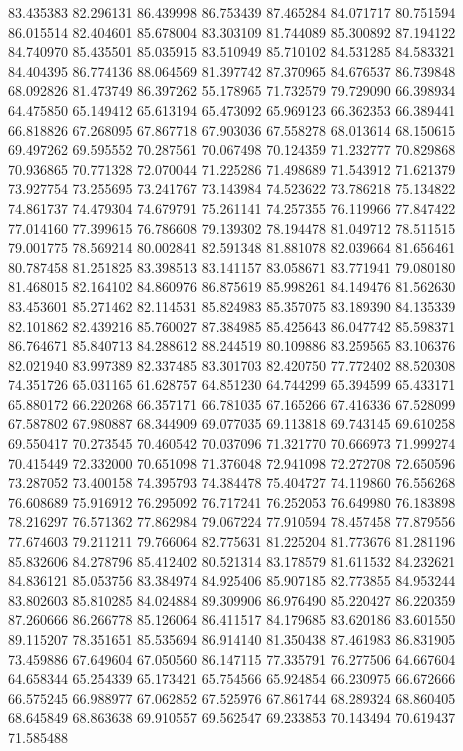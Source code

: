 83.435383
82.296131
86.439998
86.753439
87.465284
84.071717
80.751594
86.015514
82.404601
85.678004
83.303109
81.744089
85.300892
87.194122
84.740970
85.435501
85.035915
83.510949
85.710102
84.531285
84.583321
84.404395
86.774136
88.064569
81.397742
87.370965
84.676537
86.739848
68.092826
81.473749
86.397262
55.178965
71.732579
79.729090
66.398934
64.475850
65.149412
65.613194
65.473092
65.969123
66.362353
66.389441
66.818826
67.268095
67.867718
67.903036
67.558278
68.013614
68.150615
69.497262
69.595552
70.287561
70.067498
70.124359
71.232777
70.829868
70.936865
70.771328
72.070044
71.225286
71.498689
71.543912
71.621379
73.927754
73.255695
73.241767
73.143984
74.523622
73.786218
75.134822
74.861737
74.479304
74.679791
75.261141
74.257355
76.119966
77.847422
77.014160
77.399615
76.786608
79.139302
78.194478
81.049712
78.511515
79.001775
78.569214
80.002841
82.591348
81.881078
82.039664
81.656461
80.787458
81.251825
83.398513
83.141157
83.058671
83.771941
79.080180
81.468015
82.164102
84.860976
86.875619
85.998261
84.149476
81.562630
83.453601
85.271462
82.114531
85.824983
85.357075
83.189390
84.135339
82.101862
82.439216
85.760027
87.384985
85.425643
86.047742
85.598371
86.764671
85.840713
84.288612
88.244519
80.109886
83.259565
83.106376
82.021940
83.997389
82.337485
83.301703
82.420750
77.772402
88.520308
74.351726
65.031165
61.628757
64.851230
64.744299
65.394599
65.433171
65.880172
66.220268
66.357171
66.781035
67.165266
67.416336
67.528099
67.587802
67.980887
68.344909
69.077035
69.113818
69.743145
69.610258
69.550417
70.273545
70.460542
70.037096
71.321770
70.666973
71.999274
70.415449
72.332000
70.651098
71.376048
72.941098
72.272708
72.650596
73.287052
73.400158
74.395793
74.384478
75.404727
74.119860
76.556268
76.608689
75.916912
76.295092
76.717241
76.252053
76.649980
76.183898
78.216297
76.571362
77.862984
79.067224
77.910594
78.457458
77.879556
77.674603
79.211211
79.766064
82.775631
81.225204
81.773676
81.281196
85.832606
84.278796
85.412402
80.521314
83.178579
81.611532
84.232621
84.836121
85.053756
83.384974
84.925406
85.907185
82.773855
84.953244
83.802603
85.810285
84.024884
89.309906
86.976490
85.220427
86.220359
87.260666
86.266778
85.126064
86.411517
84.179685
83.620186
83.601550
89.115207
78.351651
85.535694
86.914140
81.350438
87.461983
86.831905
73.459886
67.649604
67.050560
86.147115
77.335791
76.277506
64.667604
64.658344
65.254339
65.173421
65.754566
65.924854
66.230975
66.672666
66.575245
66.988977
67.062852
67.525976
67.861744
68.289324
68.860405
68.645849
68.863638
69.910557
69.562547
69.233853
70.143494
70.619437
71.585488
